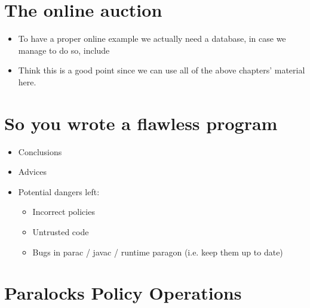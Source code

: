 \documentclass{book}
\begin{document}
\chapter{The online auction}
\label{chap:auction}

\begin{itemize}

  \item To have a proper online example we actually need a database, in case we
         manage to do so, include
         
  \item Think this is a good point since we can use all of the above chapters'
         material here. 

\end{itemize}

\chapter{So you wrote a flawless program}
\label{chap:conclusions}

\begin{itemize}

  \item Conclusions
  
  \item Advices
  
  \item Potential dangers left:
  
  \begin{itemize}

    \item Incorrect policies
    
    \item Untrusted code
    
    \item Bugs in parac / javac / runtime paragon (i.e. keep them up to date) 

  \end{itemize}

\end{itemize}

\appendix

\chapter{Paralocks Policy Operations}
\label{app:paralocksOperations}


\end{document}
